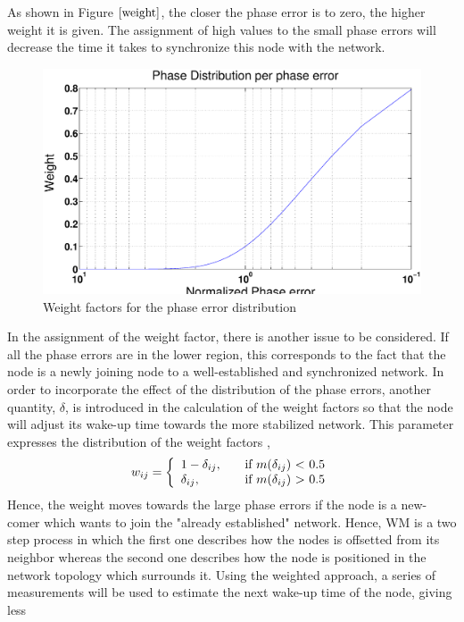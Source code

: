 \documentclass[a4paper,10pt]{report}
\begin{document}
\newline
As shown in Figure $\ref{weight}$, the closer the phase error is to zero, the
higher weight it is given. The assignment of high
values to the small phase errors will decrease the time it takes to
synchronize  this node with the network.
\begin{figure}
\centering
\includegraphics[width= 0.75 \textwidth]{weight}
\caption{Weight factors for the phase error distribution}
\label{weight}
\end{figure}
\newline
In the assignment of the weight factor, there is another issue to be
considered. If all the phase errors are in the lower region, this
corresponds to the fact that the node is a newly joining node to a
well-established and synchronized network.  In order to incorporate the
effect of the distribution of the phase errors, another quantity,
$\delta$, is introduced in the calculation of the weight factors so
that the node will adjust its wake-up time towards the more
stabilized network. This parameter expresses the distribution of the
weight factors ,
\[w_{ij} = \left\{
\begin{array}{l l}
  1 - \delta_{ij},& \quad \mbox{if $m(\delta_{ij}$) $<$ 0.5}\\
 \delta_{ij}, & \quad \mbox{if $m(\delta_{ij}$) $>$ 0.5}\\ \end{array} \right. \]
Hence, the weight moves towards the large phase errors if the node
is a new-comer which wants to join the "already established"
network.
\newline Hence, WM is a two step process in which the first one describes how the nodes
is offsetted from its neighbor whereas the second one describes how the
node is positioned in the network topology which surrounds it.
\newline
Using the weighted approach, a series of measurements will be used
to estimate the next wake-up time of the node, giving less
\end{document}
